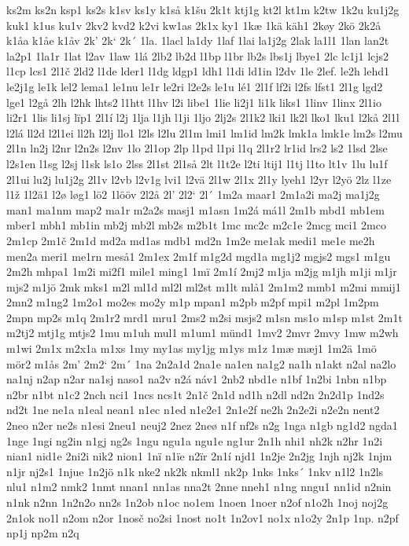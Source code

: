 ks2m
ks2n
ksp1
ks2s
k1sv
ks1y
k1så
k1šu
2k1t
ktj1g
kt2l
kt1m
k2tw
1k2u
ku1j2g
kuk1
k1us
ku1v
2kv2
kvd2
k2vi
kw1as
2k1x
ky1
1kæ
1kä
käh1
2køy
2kö
2k2å
k1åa
k1åe
k1åv
2k'
2k`
2k´
1la.
1lacl
la1dy
1laf
1lai
la1j2g
2lak
la1l1
1lan
lan2t
la2p1
1la1r
1lat
l2av
1law
1lá
2lb2
lb2d
l1bp
l1br
lb2s
lbs1j
lbye1
2lc
lc1j1
lcjs2
l1cp
lcs1
2l1č
2ld2
l1de
lder1
l1dg
ldgp1
ldh1
l1di
ld1in
l2dv
1le
2lef.
le2h
lehd1
le2j1g
le1k
lel2
lema1
le1nu
le1r
le2ri
l2e2s
le1u
lé1
2l1f
lf2i
l2fs
lfst1
2l1g
lgd2
lge1
l2gå
2lh
l2hk
lhts2
l1htt
l1hv
l2i
libe1
1lie
li2j1
li1k
liks1
1linv
1linx
2l1io
li2r1
1lis
li1sj
lïp1
2l1í
l2j
1lja
l1jh
l1ji
1ljo
2lj2s
2l1k2
lki1
lk2l
lko1
lku1
l2kå
2l1l
l2lá
ll2d
l2l1ei
ll2h
l2lj
llo1
l2ls
l2lu
2l1m
lmi1
lm1id
lm2k
lmk1a
lmk1e
lm2s
l2mu
2l1n
ln2j
l2nr
l2n2s
l2nv
1lo
2l1op
2lp
l1pd
l1pi
l1q
2l1r2
lr1id
lrs2
ls2
1lsd
2lse
l2s1en
l1sg
l2sj
l1sk
ls1o
2lss
2l1st
2l1så
2lt
l1t2e
l2ti
ltij1
l1tj
l1to
lt1v
1lu
lu1f
2l1ui
lu2j
lu1j2g
2l1v
l2vb
l2v1g
lvi1
l2vä
2l1w
2l1x
2l1y
lyeh1
l2yr
l2yö
2lz
l1ze
l1ž
1l2ä1
l2ø
løg1
lö2
1lööv
2l2å
2l'
2l2`
2l´
1m2a
maar1
2m1a2i
ma2j
ma1j2g
man1
ma1nm
map2
ma1r
m2a2s
masj1
m1asn
1m2á
má1l
2m1b
mbd1
mb1em
mber1
mbh1
mb1in
mb2j
mb2l
mb2s
m2b1t
1mc
mc2c
m2c1e
2mcg
mci1
2mco
2m1cp
2m1č
2m1d
md2a
md1as
mdb1
md2n
1m2e
me1ak
medi1
me1e
me2h
men2a
meri1
me1rn
meså1
2m1ex
2m1f
m1g2d
mgd1a
mg1j2
mgjs2
mgs1
m1gu
2m2h
mhpa1
1m2i
mi2f1
mile1
ming1
1mï
2m1í
2mj2
m1ja
m2jg
m1jh
m1ji
m1jr
mjs2
m1jö
2mk
mks1
m2l
ml1d
ml2l
ml2st
m1lt
mlå1
2m1m2
mmb1
m2mi
mmij1
2mn2
m1ng2
1m2o1
mo2es
mo2y
m1p
mpan1
m2pb
m2pf
mpi1
m2pl
1m2pm
2mpn
mp2s
m1q
2m1r2
mrd1
mru1
2ms2
m2si
msjs2
m1sn
ms1o
m1sp
m1st
2m1t
m2tj2
mtj1g
mtjs2
1mu
m1uh
mul1
m1um1
münd1
1mv2
2mvr
2mvy
1mw
m2wh
m1wi
2m1x
m2x1a
m1xs
1my
my1as
my1jg
m1ys
m1z
1mæ
mæj1
1m2ä
1mö
mör2
m1ås
2m'
2m2`
2m´
1na
2n2a1d
2na1e
na1en
na1g2
na1h
n1akt
n2al
na2lo
na1nj
n2ap
n2ar
na1sj
naso1
na2v
n2á
náv1
2nb2
nbd1e
n1bf
1n2bi
1nbn
n1bp
n2br
n1bt
n1c2
2nch
nci1
1ncs
ncs1t
2n1č
2n1d
nd1h
n2dl
nd2n
2n2d1p
1nd2s
nd2t
1ne
ne1a
n1eal
nean1
n1ec
n1ed
n1e2e1
2n1e2f
ne2h
2n2e2i
n2e2n
nent2
2neo
n2er
ne2s
n1esi
2neu1
neuj2
2nez
2neø
n1f
nf2s
n2g
1nga
n1gb
ng1d2
ngda1
1nge
1ngi
ng2in
n1gj
ng2s
1ngu
ngu1a
ngu1e
ng1ur
2n1h
nhi1
nh2k
n2hr
1n2i
nian1
nid1e
2ni2i
nik2
nion1
1nï
n1ïe
n2ïr
2n1í
njd1
1n2je
2n2jg
1njh
nj2k
1njm
n1jr
nj2s1
1njue
1n2jö
n1k
nke2
nk2k
nkml1
nk2p
1nks
1nks´
1nkv
n1l2
1n2ls
nlu1
n1m2
nmk2
1nmt
nnan1
nn1as
nna2t
2nne
nneh1
n1ng
nngu1
nn1id
n2nin
n1nk
n2nn
1n2n2o
nn2s
1n2ob
n1oc
no1em
1noen
1noer
n2of
n1o2h
1noj
noj2g
2n1ok
no1l
n2om
n2or
1nosč
no2si
1nost
no1t
1n2ov1
no1x
n1o2y
2n1p
1np.
n2pf
np1j
np2m
n2q
